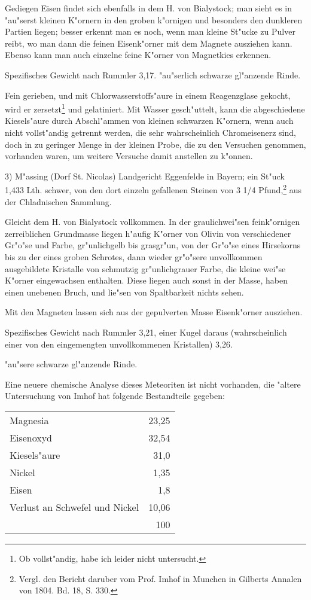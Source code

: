 \documentclass[a4paper, 11pt, oneside, german]{article}
\begin{document}
Gediegen Eisen findet sich ebenfalls in dem H. von Bialystock; man sieht es in "au"serst kleinen K"ornern in den groben k"ornigen und besonders den dunkleren Partien liegen; besser erkennt man es noch, wenn man kleine St"ucke zu Pulver reibt, wo man dann die feinen Eisenk"orner mit dem Magnete ausziehen kann. Ebenso kann man auch einzelne feine K"orner von Magnetkies erkennen.

Spezifisches Gewicht nach Rummler 3,17. "au"serlich schwarze gl"anzende Rinde.

Fein gerieben, und mit Chlorwasserstoffs"aure in einem Reagenzglase gekocht, wird er zersetzt\footnote{Ob vollst"andig, habe ich leider nicht untersucht.} und gelatiniert. Mit Wasser gesch"uttelt, kann die abgeschiedene Kiesels"aure durch Abschl"ammen von kleinen schwarzen K"ornern, wenn auch nicht vollst"andig getrennt werden, die sehr wahrscheinlich Chromeisenerz sind, doch in zu geringer Menge in der kleinen Probe, die zu den Versuchen genommen, vorhanden waren, um weitere Versuche damit anstellen zu k"onnen.

3) M"assing (Dorf St. Nicolas) Landgericht Eggenfelde in Bayern; ein St"uck 1,433 Lth. schwer, von den dort einzeln gefallenen Steinen von 3 1/4 Pfund,\footnote{Vergl. den Bericht daruber vom Prof. Imhof in Munchen in Gilberts Annalen von 1804. Bd. 18, S. 330.} aus der Chladnischen Sammlung.

Gleicht dem H. von Bialystock vollkommen. In der graulichwei"sen feink"ornigen zerreiblichen Grundmasse liegen h"aufig K"orner von Olivin von verschiedener Gr"o"se und Farbe, gr"unlichgelb bis grasgr"un, von der Gr"o"se eines Hirsekorns bis zu der eines groben Schrotes, dann wieder gr"o"sere unvollkommen ausgebildete Kristalle von schmutzig gr"unlichgrauer Farbe, die kleine wei"se K"orner eingewachsen enthalten. Diese liegen auch sonst in der Masse, haben einen unebenen Bruch, und lie"sen von Spaltbarkeit nichts sehen.

Mit den Magneten lassen sich aus der gepulverten Masse Eisenk"orner ausziehen.

Spezifisches Gewicht nach Rummler 3,21, einer Kugel daraus (wahrscheinlich einer von den eingemengten unvollkommenen Kristallen) 3,26.

"au"sere schwarze gl"anzende Rinde.

Eine neuere chemische Analyse dieses Meteoriten ist nicht vorhanden, die "altere Untersuchung von Imhof hat folgende Bestandteile gegeben:
\begin{center}
\begin{tabular}{ l r }
    Magnesia & 23,25\\
    Eisenoxyd & 32,54\\
    Kiesels"aure & 31,0\\
    Nickel & 1,35\\
    Eisen & 1,8\\
    Verlust an Schwefel und Nickel & 10,06\\
     & 100\\  
\end{tabular}
\end{center}
\end{document}
